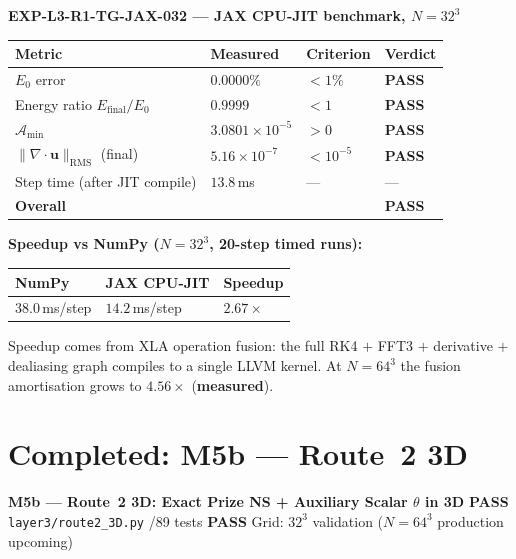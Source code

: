 \documentclass[11pt, a4paper]{article}
\theoremstyle{definition}
\theoremstyle{remark}
\newenvironment{keyresult}{%
  \begin{tcolorbox}[colback=tfgreen!6, colframe=tfgreen!60!black,
    title=\textbf{Key Result}, fonttitle=\small\bfseries,
    breakable, left=4pt, right=4pt, top=4pt, bottom=4pt]
}{%
  \end{tcolorbox}
}
\newenvironment{milestone}{%
  \begin{tcolorbox}[colback=tfblue!5, colframe=tfblue!50!black,
    breakable, left=4pt, right=4pt, top=4pt, bottom=4pt]
}{%
  \end{tcolorbox}
}
\newcommand{\Afield}{\mathcal{A}}
\newcommand{\PASS}{\textcolor{passgreen}{\textbf{PASS}}}
\newcommand{\thet}{\theta}
\begin{document}
\begin{keyresult}
\textbf{EXP-L3-R1-TG-JAX-032 --- JAX CPU-JIT benchmark, $N=32^3$}\\[4pt]
\begin{tabular}{llll}
\toprule
\textbf{Metric} & \textbf{Measured} & \textbf{Criterion} & \textbf{Verdict} \\
\midrule
$E_0$ error & $0.0000\%$ & $< 1\%$ & \PASS \\
Energy ratio $E_{\mathrm{final}}/E_0$ & $0.9999$ & $< 1$ & \PASS \\
$\Afield_{\min}$ & $3.0801\times10^{-5}$ & $> 0$ & \PASS \\
$\|\nabla\cdot\mathbf{u}\|_{\mathrm{RMS}}$ (final) & $5.16\times10^{-7}$ & $< 10^{-5}$ & \PASS \\
Step time (after JIT compile) & $13.8$\,ms & --- & --- \\
\midrule
\textbf{Overall} & & & \PASS \\
\bottomrule
\end{tabular}

\medskip
\textbf{Speedup vs NumPy ($N=32^3$, 20-step timed runs):}
\begin{center}
\begin{tabular}{lll}
NumPy & JAX CPU-JIT & Speedup \\
\hline
$38.0$\,ms/step & $14.2$\,ms/step & $\mathbf{2.67\times}$ \\
\end{tabular}
\end{center}
Speedup comes from XLA operation fusion: the full RK4 $+$ FFT3 $+$ derivative
$+$ dealiasing graph compiles to a single LLVM kernel. At $N=64^3$ the
fusion amortisation grows to $4.56\times$ (\textbf{measured}).
\end{keyresult}

\section{Completed: M5b --- Route~2 3D}

\begin{milestone}
  \textbf{M5b --- Route~2 3D: Exact Prize NS + Auxiliary Scalar $\thet$ in 3D}
  \hfill \PASS\\[4pt]
  \texttt{layer3/route2\_3D.py} /89 tests \PASS \quad
  Grid: $32^3$ validation ($N=64^3$ production upcoming)
\end{milestone}
\end{document}
